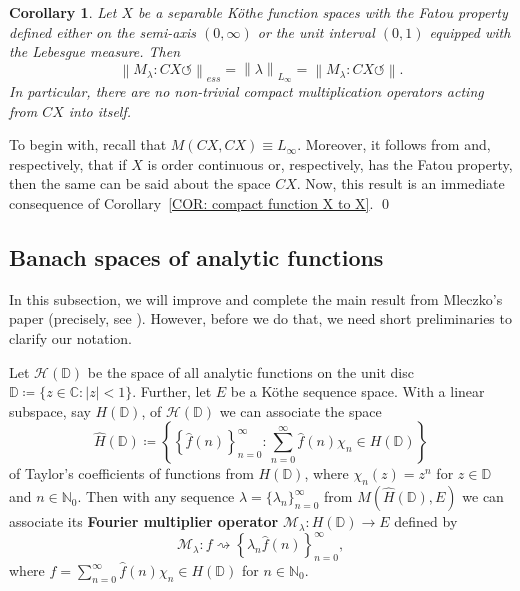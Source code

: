 \documentclass[11pt]{amsart}
\theoremstyle{definition}
\theoremstyle{definition}
\theoremstyle{definition}
\newtheorem{corollary}[theorem]{Corollary}
\theoremstyle{definition}
\theoremstyle{definition}
\theoremstyle{definition}
\theoremstyle{definition}
\theoremstyle{definition}
\numberwithin{equation}{section}
\numberwithin{equation}{section}
\numberwithin{equation}{section}
\theoremstyle{definition}
\theoremstyle{definition}
\theoremstyle{definition}
\theoremstyle{definition}
\theoremstyle{definition}
\theoremstyle{definition}
\newcommand{\norm}[1]{\left\lVert#1\right\rVert}
\newcommand{\abs}[1]{\left\lvert#1\right\rvert}
\renewenvironment{proof}{\noindent {\bf Proof.}}{\qed}
\begin{document}
\begin{corollary}
	{\it Let $X$ be a separable K{\" o}the function spaces with the Fatou property defined either on the semi-axis $(0,\infty)$
	or the unit interval $(0,1)$ equipped with the Lebesgue measure. Then}
		\begin{equation*}
			\norm{M_{\lambda} \colon CX \circlearrowleft}_{ess} = \norm{\lambda}_{L_{\infty}} = \norm{M_{\lambda} \colon CX \circlearrowleft}.
		\end{equation*}
		{\it In particular, there are no non-trivial compact multiplication operators acting from $CX$ into itself.}
\end{corollary}
\begin{proof}
	To begin with, recall that $M(CX,CX) \equiv L_{\infty}$. Moreover, it follows from \cite[Lemma~11]{KT17} and, respectively, \cite[Lemma~1(d)]{LM15a}
	that if $X$ is order continuous or, respectively, has the Fatou property, then the same can be said about the space $CX$. Now, this result is an immediate
	consequence of Corollary~\ref{COR: compact function X to X}.
\end{proof}

\subsection{Banach spaces of analytic functions}
In this subsection, we will improve and complete the main result from Mleczko's paper \cite{Mle09} (precisely, see \cite[Theorem~2.5]{Mle09}).
However, before we do that, we need short preliminaries to clarify our notation.

Let $\mathscr{H}(\mathbb{D})$ be the space of all analytic functions on the unit disc $\mathbb{D} \coloneqq \{z \in \mathbb{C} \colon \abs{z} < 1\}$.
Further, let $E$ be a K{\" o}the sequence space. With a linear subspace, say $H(\mathbb{D})$, of $\mathscr{H}(\mathbb{D})$ we can associate
the space
\begin{equation*}
	\widehat{H}(\mathbb{D}) \coloneqq \left\{ \left\{ \widehat{f}(n) \right\}_{n=0}^{\infty} \colon \sum_{n=0}^{\infty} \widehat{f}(n)\chi_n \in H(\mathbb{D}) \right\}
\end{equation*}
of Taylor's coefficients of functions from $H(\mathbb{D})$, where $\chi_n(z) = z^n$ for $z \in \mathbb{D}$ and $n \in \mathbb{N}_0$.
Then with any sequence $\lambda = \{\lambda_n\}_{n=0}^{\infty}$ from $M(\widehat{H}(\mathbb{D}),E)$ we can associate its {\bf Fourier multiplier operator}
$\mathscr{M}_{\lambda} \colon H(\mathbb{D}) \rightarrow E$ defined by
\begin{equation*}
	\mathscr{M}_{\lambda} \colon f \rightsquigarrow \left\{ \lambda_n \widehat{f}(n) \right\}_{n=0}^{\infty},
\end{equation*}
where $f = \sum_{n=0}^{\infty} \widehat{f}(n)\chi_n \in H(\mathbb{D})$ for $n \in \mathbb{N}_0$.
\end{document}
